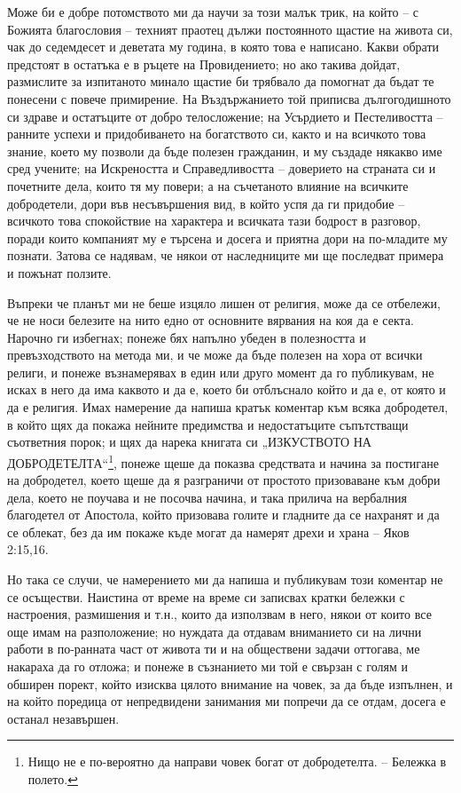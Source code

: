 \documentclass[12pt]{book}
\begin{document}
Може би е добре потомството ми да научи за този малък трик, на който – с Божията благословия – техният праотец дължи постоянното щастие на живота си, чак до седемдесет и деветата му година, в която това е написано. Какви обрати предстоят в остатъка е в ръцете на Провидението; но ако такива дойдат, размислите за изпитаното минало щастие би трябвало да помогнат да бъдат те понесени с повече примирение. На Въздържанието той приписва дългогодишното си здраве и остатъците от добро телосложение; на Усърдието и Пестеливостта – ранните успехи и придобиването на богатството си, както и на всичкото това знание, което му позволи да бъде полезен гражданин, и му създаде някакво име сред учените; на Искреността и Справедливостта – доверието на страната си и почетните дела, които тя му повери; а на съчетаното влияние на всичките добродетели, дори във несъвършения вид, в който успя да ги придобие – всичкото това спокойствие на характера и всичката тази бодрост в разговор, поради които компаният му е търсена и досега и приятна дори на по-младите му познати. Затова се надявам, че някои от наследниците ми ще последват примера и пожънат ползите.

Въпреки че планът ми не беше изцяло лишен от религия, може да се отбележи, че не носи белезите на нито едно от основните вярвания на коя да е секта. Нарочно ги избегнах; понеже бях напълно убеден в полезността и превъзходството на метода ми, и че може да бъде полезен на хора от всички религи, и понеже възнамерявах в един или друго момент да го публикувам, не исках в него да има каквото и да е, което би отблъснало който и да е, от която и да е религия. Имах намерение да напиша кратък коментар към всяка добродетел, в който щях да покажа нейните предимства и недостатъците съпътстващи съответния порок; и щях да нарека книгата си „ИЗКУСТВОТО НА ДОБРОДЕТЕЛТА“\footnote{Нищо не е по-вероятно да направи човек богат от добродетелта. -- Бележка в полето.}, понеже щеше да показва средствата и начина за постигане на добродетел, което щеше да я разграничи от простото призоваване към добри дела, което не поучава и не посочва начина, и така прилича на вербалния благодетел от Апостола, който призовава голите и гладните да се нахранят и да се облекат, без да им покаже къде могат да намерят дрехи и храна – Яков 2:15,16.

Но така се случи, че намерението ми да напиша и публикувам този коментар не се осъществи. Наистина от време на време си записвах кратки бележки с настроения, размишения и т.н., които да използвам в него, някои от които все още имам на разположение; но нуждата да отдавам вниманието си на лични работи в по-ранната част от живота ти и на обществени задачи оттогава, ме накараха да го отложа; и понеже в съзнанието ми той е свързан с голям и обширен порект, който изисква цялото внимание на човек, за да бъде изпълнен, и на който поредица от непредвидени занимания ми попречи да се отдам, досега е останал незавършен.
\end{document}
